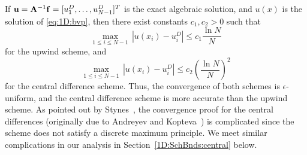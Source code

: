 
If $\mathbf{u}=\mathbf{A}^{-1}\mathbf{f}=[u_1^D,\dots,u_{N-1}^D]^T$ is the exact algebraic
solution, and $u(x)$ is the solution of \eqref{eq:1D:bvp}, then there exist
constants $c_1,c_2>0$ such that
%
$$\max_{1\leq i\leq N-1}\,|u(x_i)-u_i^D| \leq c_1 \frac{\ln N}{N}$$
%
for the upwind scheme, and
%
$$\max_{1\leq i\leq N-1}\,|u(x_i)-u_i^D| \leq c_2 \left(\frac{\ln N}{N}\right)^2$$
%
for the central difference scheme. Thus, the convergence of both schemes is
$\epsilon$-uniform, and the central difference scheme is more accurate than the
upwind scheme. As pointed out by Stynes~\cite[p.~470]{Sty05}, the convergence
proof for the central differences (originally due to Andreyev and
Kopteva~\cite{AndKop96}) is complicated since the scheme does not satisfy a
discrete maximum principle. We meet similar complications in our analysis in
Section~\ref{1D:SchBnds:central} below.




